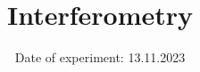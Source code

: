 
\subject{V64}
\title{Interferometry}
\date{%
  Date of experiment: 13.11.2023
}

\maketitle
\thispagestyle{empty}
\tableofcontents
\newpage




\printbibliography{}
\appendix
\newpage


